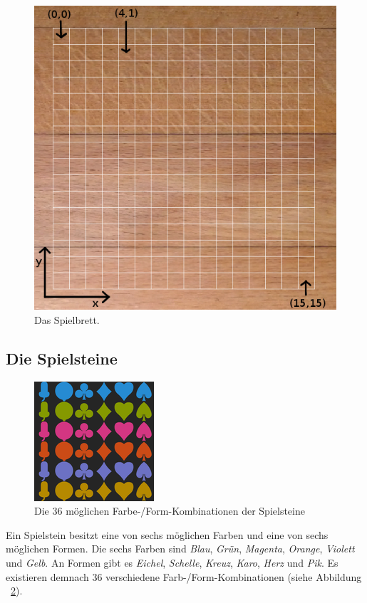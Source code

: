 \documentclass[a4paper, ngerman]{scrartcl}
\begin{document}
\begin{figure}[h] \centering 
	\includegraphics[scale = 0.3]{images/Spielbrett}
	\caption{Das Spielbrett.}
	\label{fig:Spielfeld}
\end{figure}

\subsection{Die Spielsteine}
\begin{figure}[!h] \centering 
	\includegraphics[scale = 0.8]{images/Spielsteine}
	\caption{Die 36 möglichen Farbe-/Form-Kombinationen der Spielsteine}
	\label{fig:Spielsteine}
\end{figure}
Ein Spielstein besitzt eine von sechs möglichen Farben und eine von sechs möglichen Formen. Die sechs Farben sind \emph{Blau},  \emph{Grün}, \emph{Magenta}, \emph{Orange}, \emph{Violett} und \emph{Gelb}. An Formen gibt es \emph{Eichel}, \emph{Schelle}, \emph{Kreuz}, \emph{Karo}, \emph{Herz} und \emph{Pik}.  Es existieren demnach 36 verschiedene Farb-/Form-Kombinationen (siehe Abbildung ~\ref{fig:Spielsteine}).\\
\end{document}
